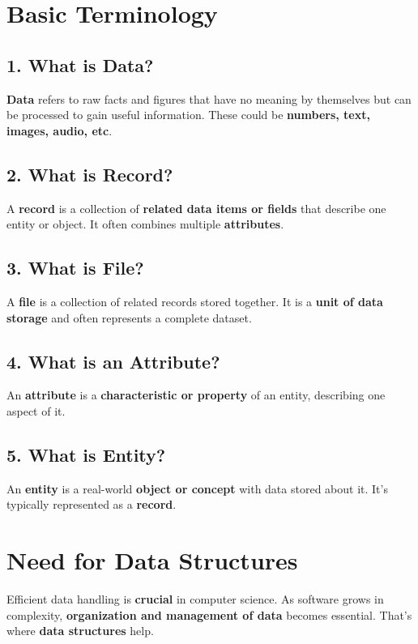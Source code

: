\newpage
\section*{\Large \textbf{Basic Terminology}}

\subsection*{\textbf{1. What is Data?}}
\textbf{Data} refers to raw facts and figures that have no meaning by themselves but can be processed to gain useful information. These could be \textbf{numbers, text, images, audio, etc}.

\subsection*{\textbf{2. What is Record?}}
A \textbf{record} is a collection of \textbf{related data items or fields} that describe one entity or object. It often combines multiple \textbf{attributes}.

\subsection*{\textbf{3. What is File?}}
A \textbf{file} is a collection of related records stored together. It is a \textbf{unit of data storage} and often represents a complete dataset.

\subsection*{\textbf{4. What is an Attribute?}}
An \textbf{attribute} is a \textbf{characteristic or property} of an entity, describing one aspect of it.

\subsection*{\textbf{5. What is Entity?}}
An \textbf{entity} is a real-world \textbf{object or concept} with data stored about it. It’s typically represented as a \textbf{record}.

\section*{\Large \textbf{Need for Data Structures}}
Efficient data handling is \textbf{crucial} in computer science. As software grows in complexity, \textbf{organization and management of data} becomes essential. That’s where \textbf{data structures} help.


